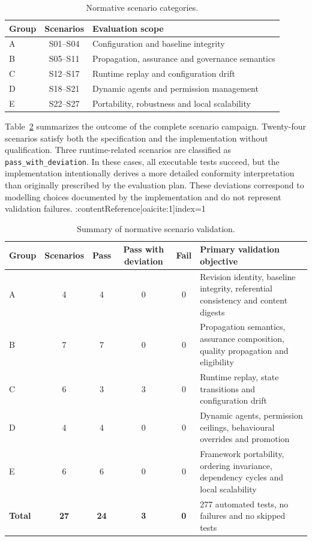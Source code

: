 \documentclass[10pt]{article}
\begin{document}
\begin{table}[t]
\centering
\caption{Normative scenario categories.}
\label{tab:scenario_categories}
\begin{tabularx}{\linewidth}{lcl}
\toprule
Group & Scenarios & Evaluation scope \\
\midrule
A & S01--S04 &
Configuration and baseline integrity \\
B & S05--S11 &
Propagation, assurance and governance semantics \\
C & S12--S17 &
Runtime replay and configuration drift \\
D & S18--S21 &
Dynamic agents and permission management \\
E & S22--S27 &
Portability, robustness and local scalability \\
\bottomrule
\end{tabularx}
\end{table}

Table~\ref{tab:scenario_results} summarizes the outcome of the complete scenario campaign. Twenty-four scenarios satisfy both the specification and the implementation without qualification. Three runtime-related scenarios are classified as \texttt{pass\_with\_deviation}. In these cases, all executable tests succeed, but the implementation intentionally derives a more detailed conformity interpretation than originally prescribed by the evaluation plan. These deviations correspond to modelling choices documented by the implementation and do not represent validation failures. :contentReference[oaicite:1]{index=1}

\begin{table}[t]
\centering
\caption{Summary of normative scenario validation.}
\label{tab:scenario_results}
\begin{tabularx}{\textwidth}{lccccX}
\toprule
Group &
Scenarios &
Pass &
Pass with deviation &
Fail &
Primary validation objective \\
\midrule
A &
4 &
4 &
0 &
0 &
Revision identity, baseline integrity, referential consistency and content digests \\

B &
7 &
7 &
0 &
0 &
Propagation semantics, assurance composition, quality propagation and eligibility \\

C &
6 &
3 &
3 &
0 &
Runtime replay, state transitions and configuration drift \\

D &
4 &
4 &
0 &
0 &
Dynamic agents, permission ceilings, behavioural overrides and promotion \\

E &
6 &
6 &
0 &
0 &
Framework portability, ordering invariance, dependency cycles and local scalability \\

\midrule
\textbf{Total} &
\textbf{27} &
\textbf{24} &
\textbf{3} &
\textbf{0} &
277 automated tests, no failures and no skipped tests \\
\bottomrule
\end{tabularx}
\end{table}
\end{document}
